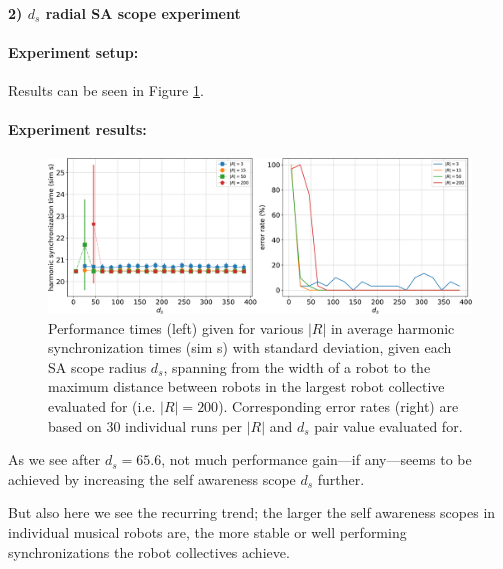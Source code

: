 				 
			\paragraph{2) $d_s$ radial SA scope experiment}
			
				\paragraph{Experiment setup:\nl}
				
				Results can be seen in Figure \ref{fig:phase_sync_d_s_SA_scope_tuning}.
				
				\paragraph{Experiment results:\nl}
				
				\begin{figure}[ht!]
					\centering
					\includegraphics[width=\linewidth]{Assets/DocSegments/Chapters/ExperimentsAndResults/Figures/PerfScores/phase_sync_d_s_SA_scope_tuning_experiment_performance.pdf}
					\caption[Experiment results for $\phi$ synchronization $d_s$ SA scope tuning experiment.]{Performance times (left) given for various $|R|$ in average harmonic synchronization times (sim s) with standard deviation, given each SA scope radius $d_s$, spanning from the width of a robot to the maximum distance between robots in the largest robot collective evaluated for (i.e. $|R|=200$). Corresponding error rates (right) are based on 30 individual runs per $|R|$ and $d_s$ pair value evaluated for.}
					\label{fig:phase_sync_d_s_SA_scope_tuning}
				\end{figure}
				
				As we see after $d_s=65.6$, not much performance gain—if any—seems to be achieved by increasing the self awareness scope $d_s$ further.
				
				But also here we see the recurring trend; the larger the self awareness scopes in individual musical robots are, the more stable or well performing synchronizations the robot collectives achieve.
				
